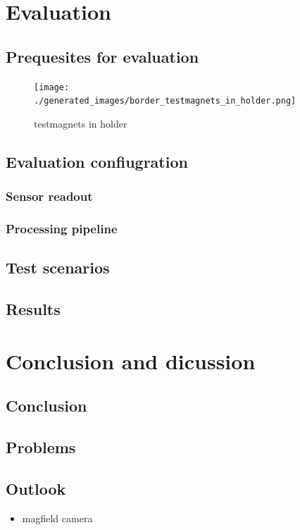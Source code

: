 \hypertarget{evaluation}{%
\chapter{Evaluation}\label{evaluation}}

\hypertarget{prequesites-for-evaluation}{%
\section{Prequesites for evaluation}\label{prequesites-for-evaluation}}

\begin{figure}
\centering
\texttt{[image: ./generated\_images/border\_testmagnets\_in\_holder.png]}
\caption{testmagnets in holder \label{testmagnets_in_holder.png}}
\end{figure}

\hypertarget{evaluation-confiugration}{%
\section{Evaluation confiugration}\label{evaluation-confiugration}}

\hypertarget{sensor-readout}{%
\subsection{Sensor readout}\label{sensor-readout}}

\hypertarget{processing-pipeline}{%
\subsection{Processing pipeline}\label{processing-pipeline}}

\hypertarget{test-scenarios}{%
\section{Test scenarios}\label{test-scenarios}}

\hypertarget{results}{%
\section{Results}\label{results}}

\hypertarget{conclusion-and-dicussion}{%
\chapter{Conclusion and dicussion}\label{conclusion-and-dicussion}}

\hypertarget{conclusion}{%
\section{Conclusion}\label{conclusion}}

\hypertarget{problems}{%
\section{Problems}\label{problems}}

\hypertarget{outlook}{%
\section{Outlook}\label{outlook}}

\begin{itemize}
\tightlist
\item
  magfield camera
\end{itemize}

